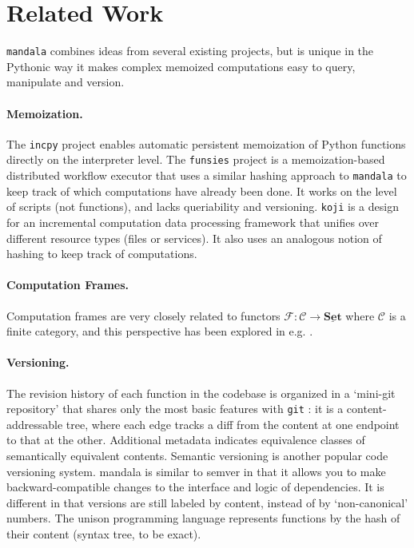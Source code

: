 \documentclass{article} %
\begin{document}
\section{Related Work}
\label{section:related-work}

\texttt{mandala} combines ideas from several existing projects, but is unique in
the Pythonic way it makes complex memoized computations easy to query,
manipulate and version.

\paragraph{Memoization.} The \texttt{incpy} project \citep{guo2011using} enables
automatic persistent memoization of Python functions directly on the interpreter
level. The \texttt{funsies} project \citep{lavigne2021funsies} is a
memoization-based distributed workflow executor that uses a similar hashing
approach to \texttt{mandala} to keep track of which computations have already
been done. It works on the level of scripts (not functions), and lacks
queriability and versioning. \texttt{koji} \citep{maymounkov2018koji} is a
design for an incremental computation data processing framework that unifies
over different resource types (files or services). It also uses an analogous
notion of hashing to keep track of computations.

\paragraph{Computation Frames.} Computation frames are very closely related to
functors $\mathcal{F}:\mathscr{C}\to \underline{\mathbf{Set}}$ where
$\mathscr{C}$ is a finite category, and this perspective has been explored in
e.g. \citep{patterson2022categorical}.

\paragraph{Versioning.} The revision history of each function in the codebase is
organized in a `mini-git repository' that shares only the most basic features
with \texttt{git} \citep{git}: it is a content-addressable tree, where each edge
tracks a diff from the content at one endpoint to that at the other. Additional
metadata indicates equivalence classes of semantically equivalent contents.
Semantic versioning \citep{semver} is another popular code versioning system.
mandala is similar to semver in that it allows you to make backward-compatible
changes to the interface and logic of dependencies. It is different in that
versions are still labeled by content, instead of by `non-canonical' numbers.
The unison programming language \citep{lozano2017unison} represents functions by
the hash of their content (syntax tree, to be exact).
\end{document}

